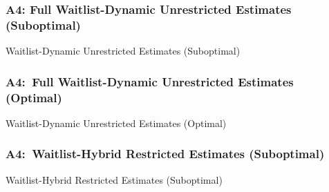 \documentclass[12pt, aspectratio=169]{beamer}
\begin{document}
\begin{frame}[label=fwdues]
\frametitle{A4: Full Waitlist-Dynamic Unrestricted Estimates (Suboptimal)}
\begin{table}[htbp]
  \centering
  \renewcommand{\thetable}{\arabic{table}a}
  \caption{Waitlist-Dynamic Unrestricted Estimates (Suboptimal)}
  \vspace{5pt}
  \begin{adjustbox}{totalheight=.7\textheight}

  \end{adjustbox}
\end{table}%
\hyperlink{wdues}{}
\end{frame}

\begin{frame}[label=fwdueo]
\frametitle{A4:\ Full Waitlist-Dynamic Unrestricted Estimates (Optimal)}
\addtocounter{framenumber}{-1}
\begin{table}[htbp]
  \centering
  \addtocounter{table}{-1}
  \renewcommand{\thetable}{\arabic{table}b}
  \caption{Waitlist-Dynamic Unrestricted Estimates (Optimal)}
  \vspace{5pt}
  \begin{adjustbox}{totalheight=.7\textheight}

  \end{adjustbox}
\end{table}%
\hyperlink{wdueo}{}
\end{frame}

\begin{frame}[label=whres]
\frametitle{A4:\ Waitlist-Hybrid Restricted Estimates (Suboptimal)}
\begin{table}[htbp]
  \centering
  \renewcommand{\thetable}{\arabic{table}a}
  \caption{Waitlist-Hybrid Restricted Estimates (Suboptimal)}
  \vspace{5pt}
  \begin{adjustbox}{totalheight=.7\textheight}

  \end{adjustbox}
\end{table}%
\hyperlink{wdues}{}
\end{frame}
\end{document}
